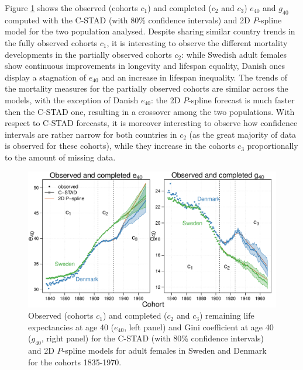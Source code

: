 \documentclass[11pt, a4paper]{article}
\begin{document}
Figure \ref{Fig:CSTADforeE40G40} shows the observed (cohorts $c_1$) and completed ($c_2$ and $c_3$) $e_{40}$ and $g_{40}$ computed with the C-STAD (with 80\% confidence intervals) and 2D $P$-spline model for the two population analysed. Despite sharing similar country trends in the fully observed cohorts $c_1$, it is interesting to observe the different mortality developments in the partially observed cohorts $c_2$: while Swedish adult females show continuous improvements in longevity and lifespan equality, Danish ones display a stagnation of $e_{40}$ and an increase in lifespan inequality. The trends of the mortality measures for the partially observed cohorts are similar across the models, with the exception of Danish $e_{40}$: the 2D $P$-spline forecast is much faster then the C-STAD one, resulting in a crossover among the two populations. With respect to C-STAD forecasts, it is moreover interesting to observe how confidence intervals are rather narrow for both countries in $c_2$ (as the great majority of data is observed for these cohorts), while they increase in the cohorts $c_3$ proportionally to the amount of missing data.   

\begin{figure}[t]
	\begin{center}
		\includegraphics[scale=0.57]{./Figures/F5.pdf} 
		\caption{Observed (cohorts $c_1$) and completed ($c_2$ and $c_3$) remaining life expectancies at age 40 ($e_{40}$, left panel) and Gini coefficient at age 40 ($g_{40}$, right panel) for the C-STAD (with 80\% confidence intervals) and 2D $P$-spline models for adult females in Sweden and Denmark for the cohorts 1835-1970.\label{Fig:CSTADforeE40G40}}    
	\end{center}
\end{figure}
\end{document}
